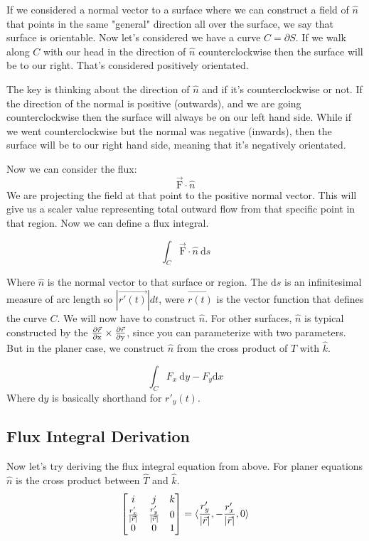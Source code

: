 {
	If we considered a normal vector to a surface where we can construct a field of $\hat{n}$ that points in the same "general" direction all over the surface, we say that surface is orientable. Now let's considered we have a curve $C=\partial{S}$. If we walk along $C$ with our head in the direction of $\hat{n}$ counterclockwise then the surface will be to our right. That's considered positively orientated.
	\vspace{5pt}

	The key is thinking about the direction of $\hat{n}$ and if it's counterclockwise or not. If the direction of the normal is positive (outwards), and we are going counterclockwise then the surface will always be on our left hand side. While if we went counterclockwise but the normal was negative (inwards), then the surface will be to our right hand side, meaning that it's negatively orientated.  
}

Now we can consider the flux:
\begin{equation*}
	\vec{\mathrm{F}} \cdot \hat{n} 
\end{equation*}
We are projecting the field at that point to the positive normal vector. This will give us a scaler value representing total outward flow from that specific point in that region. Now we can define a flux integral.

{
	\begin{equation*}
		\int_C \vec{\mathrm{F}} \cdot \hat{n} \: \mathrm{d}s
	\end{equation*}

	Where $\hat{n}$ is the normal vector to that surface or region. The $\mathrm{d}s$ is an infinitesimal measure of arc length so $|\vec{r'(t)}|dt$, were $\vec{r(t)}$ is the vector function that defines the curve $C$. We will now have to construct $\hat{n}$. For other surfaces, $\hat{n}$ is typical constructed by the $\frac{\partial \vec{r}}{\partial\mathrm{x}} \times \frac{\partial \vec{r}}{\partial\mathrm{y}}$, since you can parameterize with two parameters. But in the planer case, we construct $\hat{n}$ from the cross product of $\hat{T}$ with $\hat{k}$.

	\vspace{5pt}
	\begin{equation*}
		\int_C F_x \:\mathrm{d}y - F_y\mathrm{d}x
	\end{equation*}
	Where $\mathrm{d}y$ is basically shorthand for $r'_y(t)$.
}

\subsection{Flux Integral Derivation}
Now let's try deriving the flux integral equation from above. For planer equations $\hat{n}$ is the cross product between $\hat{T}$ and $\hat{k}$.
\begin{equation*}
	\begin{bmatrix}i&j&k \\ \frac{r'_x}{|\vec{r}|}&\frac{r'_y}{|\vec{r}|}&0 \\0&0&1 \end{bmatrix} = \langle \frac{r'_y}{|\vec{r}|},-\frac{r'_x}{|\vec{r}|},0\rangle
\end{equation*}

